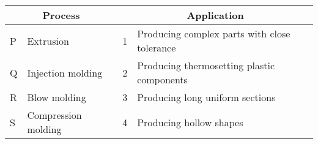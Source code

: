 \begin{center}
\begin{tabular}{|p{1cm}|p{3cm}|p{1cm}|p{7cm}|}
\hline

\multicolumn{2}{|c|}{Process} & \multicolumn{2}{c|}{Application} \\
\hline
P & Extrusion & 1 & Producing complex parts with close tolerance \\
\hline
Q & Injection molding & 2 & Producing thermosetting plastic components \\
\hline
R & Blow molding & 3 & Producing long uniform sections \\
\hline
S & Compression molding & 4 & Producing hollow shapes \\
\hline
\end{tabular}
\end{center}